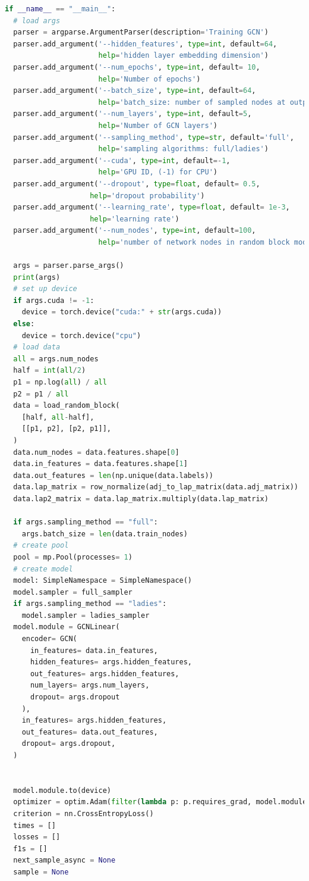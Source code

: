 \begin{lstlisting}[language=Python, caption= Training code, label=ls:train_code]
if __name__ == "__main__":
  # load args
  parser = argparse.ArgumentParser(description='Training GCN')
  parser.add_argument('--hidden_features', type=int, default=64,
                      help='hidden layer embedding dimension')
  parser.add_argument('--num_epochs', type=int, default= 10,
                      help='Number of epochs')
  parser.add_argument('--batch_size', type=int, default=64,
                      help='batch_size: number of sampled nodes at output layer')
  parser.add_argument('--num_layers', type=int, default=5,
                      help='Number of GCN layers')
  parser.add_argument('--sampling_method', type=str, default='full',
                      help='sampling algorithms: full/ladies')
  parser.add_argument('--cuda', type=int, default=-1,
                      help='GPU ID, (-1) for CPU')
  parser.add_argument('--dropout', type=float, default= 0.5,
                    help='dropout probability')
  parser.add_argument('--learning_rate', type=float, default= 1e-3,
                    help='learning rate')
  parser.add_argument('--num_nodes', type=int, default=100,
                      help='number of network nodes in random block model')

  args = parser.parse_args()
  print(args)
  # set up device
  if args.cuda != -1:
    device = torch.device("cuda:" + str(args.cuda))
  else:
    device = torch.device("cpu")
  # load data
  all = args.num_nodes
  half = int(all/2)
  p1 = np.log(all) / all
  p2 = p1 / all
  data = load_random_block(
    [half, all-half],
    [[p1, p2], [p2, p1]],
  )
  data.num_nodes = data.features.shape[0]
  data.in_features = data.features.shape[1]
  data.out_features = len(np.unique(data.labels))
  data.lap_matrix = row_normalize(adj_to_lap_matrix(data.adj_matrix))
  data.lap2_matrix = data.lap_matrix.multiply(data.lap_matrix)

  if args.sampling_method == "full":
    args.batch_size = len(data.train_nodes)
  # create pool
  pool = mp.Pool(processes= 1)
  # create model
  model: SimpleNamespace = SimpleNamespace()
  model.sampler = full_sampler
  if args.sampling_method == "ladies":
    model.sampler = ladies_sampler
  model.module = GCNLinear(
    encoder= GCN(
      in_features= data.in_features,
      hidden_features= args.hidden_features,
      out_features= args.hidden_features,
      num_layers= args.num_layers,
      dropout= args.dropout
    ),
    in_features= args.hidden_features,
    out_features= data.out_features,
    dropout= args.dropout,
  )


  model.module.to(device)
  optimizer = optim.Adam(filter(lambda p: p.requires_grad, model.module.parameters()), lr=args.learning_rate)
  criterion = nn.CrossEntropyLoss()
  times = []
  losses = []
  f1s = []
  next_sample_async = None
  sample = None


\end{lstlisting}
